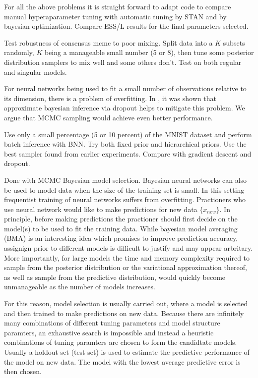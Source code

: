 \documentclass{book}
\begin{document}
\begin{enumerate}
For all the above problems it is straight forward to adapt code to compare manual hyperaparameter tuning with automatic tuning by STAN and by bayesian optimization. Compare ESS/L results for the final parameters selected. 

Test robustness of consensus mcmc to poor mixing. Split data into a $K$ subsets randomly, $K$ being a manageable small number (5 or 8), then tune some posterior distribution samplers to mix well and some others don't. Test on both regular and singular models.
 
For neural networks being used to fit a small number of observations relative to its dimension, there is a problem of overfitting. In \cite{gal2015bayesian}, it was shown that approximate bayesian inference via dropout helps to mitigate this problem. We argue that MCMC sampling would achieve even better performance.

Use only a small percentage (5 or 10 percent) of the MNIST dataset and perform batch inference with BNN. Try both fixed prior and hierarchical priors. Use the best sampler found from earlier experiments. 
Compare with gradient descent and dropout. 

Done with MCMC
Bayesian model selection. 
Bayesian neural networks can also be used to model data when the size of the training set is small. In this setting frequentist training of neural networks suffers from overfitting. Practioners who use neural network would like to make predictions for new data $\{x_{new}\}$. In principle, before making predictions the practioner should first decide on the model(s) to be used to fit the training data. While bayesian model averaging (BMA) is an interesting idea which promises to improve prediction accuracy, assignign prior to different models is difficult to justify and may appear arbritary. More importantly, for large models the time and memory complexity required to sample from the posterior distribution or the variational approximation thereof, as well as sample from the predictive distribution, would quickly become unmanageable as the number of models increases. 

For this reason, model selection is usually carried out, where a model is selected and then trained to make predictions on new data. Because there are infinitely many combinations of different tuning parameters and model structure paramters, an exhaustive search is impossible and instead a heuristic combinations of tuning paramters are chosen to form the candidtate models. Usually a holdout set (test set) is used to estimate the predictive performance of the model on new data. The model with the lowest average predictive error is then chosen. 


\end{enumerate}
\end{document}
